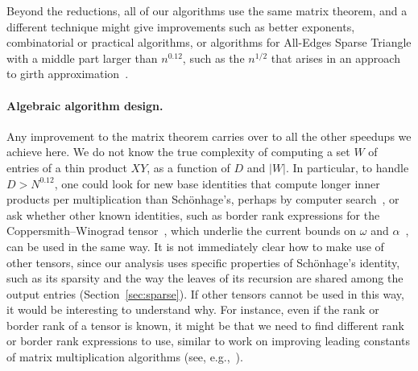 Beyond the reductions, all of our algorithms use the same matrix theorem, and a different technique might give improvements such as better exponents, combinatorial or practical algorithms, or algorithms for All-Edges Sparse Triangle with a middle part larger than $n^{0.12}$, such as the $n^{1/2}$ that arises in an approach to girth approximation~\cite{RV12}.

\paragraph{Algebraic algorithm design.}
Any improvement to the matrix theorem carries over to all the other speedups we achieve here. We do not know the true complexity of computing a set $W$ of entries of a thin product $XY$, as a function of $D$ and $|W|$. In particular, to handle $D>N^{0.12}$, one could look for new base identities that compute longer inner products per multiplication than Sch\"onhage's, perhaps by computer search~\cite{FBH+22,KM23,Nov25}, or ask whether other known identities, such as border rank expressions for the Coppersmith--Winograd tensor~\cite{CW90},  which underlie the current bounds on $\omega$ and $\alpha$~\cite{VXXZ24,ADVXXZ25,DEK+26}, can be used in the same way. It is not immediately clear how to make use of other tensors, since our analysis uses specific properties of Sch\"onhage's identity, such as its sparsity and the way the leaves of its recursion are shared among the output entries (Section~\ref{sec:sparse}). If other tensors cannot be used in this way, it would be interesting to understand why. For instance, even if the rank or border rank of a tensor is known, it might be that we need to find different rank or border rank expressions to use, similar to work on improving leading constants of matrix multiplication algorithms (see, e.g.,~\cite{BB15,KS20,BS19,AY25,MS25}). %
